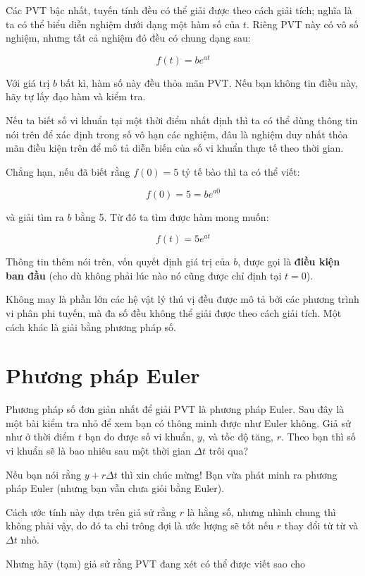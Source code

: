 \documentclass[12pt]{book}
\begin{document}
Các PVT bậc nhất, tuyến tính đều có thể giải được theo cách giải tích;
nghĩa là ta có thể biểu diễn nghiệm dưới dạng một hàm số của $t$.
Riêng PVT này có vô số nghiệm, nhưng tất cả nghiệm đó đều có chung
dạng sau:

\[ f(t) = b e^{at} \]

Với giá trị $b$ bất kì, hàm số này đều thỏa mãn PVT. Nếu bạn không 
tin điều này, hãy tự lấy đạo hàm và kiểm tra.

Nếu ta biết số vi khuẩn tại một thời điểm nhất định thì ta có thể dùng
thông tin nói trên để xác định trong số vô hạn các nghiệm, đâu là
nghiệm duy nhất thỏa mãn điều kiện trên để mô tả diễn biến của
số vi khuẩn thực tế theo thời gian.

Chẳng hạn, nếu đã biết rằng $f(0) = 5$ tỷ tế bào thì ta có thể viết:

\[ f(0) = 5 = b e^{a 0} \]

\noindent và giải tìm ra $b$ bằng 5. Từ đó ta tìm được hàm mong muốn:

\[ f(t) = 5 e^{at} \]

Thông tin thêm nói trên, vốn quyết định giá trị của $b$, được
gọi là {\bf điều kiện ban đầu} (cho dù không phải lúc nào nó
cũng được chỉ định tại $t=0$).

Không may là phần lớn các hệ vật lý thú vị đều được mô tả bởi
các phương trình vi phân phi tuyến, mà đa số đều không thể
giải được theo cách giải tích. Một cách khác là giải bằng phương pháp
số.


\section{Phương pháp Euler}

Phương pháp số đơn giản nhất để giải PVT là phương pháp Euler.
Sau đây là một bài kiểm tra nhỏ để xem bạn có thông minh được như
Euler không. Giả sử như ở thời điểm $t$ bạn đo được số vi khuẩn, 
$y$, và tốc độ tăng, $r$. Theo bạn thì số vi khuẩn sẽ là bao nhiêu
sau một thời gian $\Delta t$ trôi qua?

Nếu bạn nói rằng $y + r \Delta t$ thì xin chúc mừng! Bạn vừa 
phát minh ra phương pháp Euler (nhưng bạn vẫn chưa giỏi bằng Euler).

Cách ước tính này dựa trên giả sử rằng $r$ là hằng số, nhưng
nhình chung thì không phải vậy, do đó ta chỉ trông đợi là ước lượng
sẽ tốt nếu $r$ thay đổi từ từ và $\Delta t$ nhỏ.

Nhưng hãy (tạm) giả sử rằng PVT đang xét có thể được viết sao cho
\end{document}
